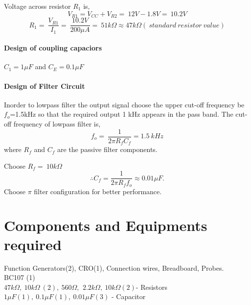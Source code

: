 \documentclass{book}
\begin{document}
\noindent Voltage across resistor $R_1$ is,
\begin{equation}
V_{R1}= V_{CC} +V_{R2} =\ 12V-1.8V=\ 10.2 V
\end{equation}
 \begin{equation}
R_1=\ \frac{V_{R1}}{I_1}= \ \frac{10.2V}{200 \mu A}=\ 51k\Omega \approx 47 k\Omega (\ standard \ resistor \ value)
\end{equation}

\paragraph{Design of coupling capaciors\\}
\noindent $C_1 = 1 \mu F$ and $C_E = 0.1 \mu F $

\paragraph{Design of Filter Circuit\\}

\noindent Inorder to lowpass filter the output signal choose the upper cut-off frequency be $f_o$=1.5kHz so that the required output 1 kHz appears in the pass band.
\noindent The cut-off frequency of lowpass filter is,
\begin{equation}
f_o=\ \frac{1}{2\pi R_fC_f}=1.5\ kHz
\end{equation}
\noindent where $R_f$ and $C_f$ are the passive filter components.

Choose $R_f=\ 10k\Omega$
\begin{equation}
\therefore C_f=\frac{1}{2\pi R_f f_o} \approx 0.01 \mu F.
\end{equation}
\noindent Choose $\pi$ filter configuration for better performance.
\section*{Components and Equipments required}
Function Generators(2), CRO(1), Connection wires, Breadboard, Probes.
\\BC107 (1)
\\ $47k\Omega,\  10k\Omega\ (2),\ 560\Omega,\,\ 2.2k\Omega ,\ 10k\Omega (2) $- Resistors
\\ $ 1\mu F (1),\ 0.1\mu F (1), \ 0.01\mu F (3)$ - Capacitor
\end{document}
